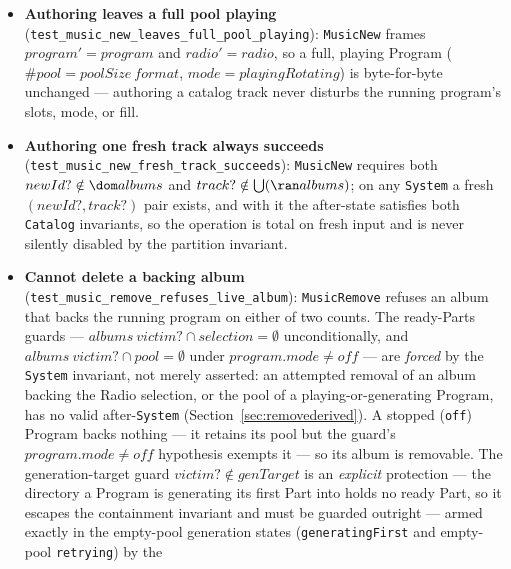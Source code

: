 \documentclass[a4paper,10pt,fleqn]{article}
\begin{document}
\begin{itemize}
    generate-internal outcome (\texttt{StaleFillIgnored}) and the auto
    vibe-switch (\texttt{RadioVibeIgnored}) stay \emph{enabled} against a Radio
    as total $\Xi Radio$ no-ops --- they are ignored, not disabled, and never
    errors. What is disabled is only the \emph{successful} fill branch: its
    $filling = ztrue$ guard has no inhabitant in a \texttt{Radio}, so that
    branch's precondition is false, leaving the enabled no-op as the sole
    inhabited operation.
  \item \textbf{Authoring leaves a full pool playing}
    (\texttt{test\_music\_new\_leaves\_full\_pool\_playing}): \texttt{MusicNew}
    frames $program' = program$ and $radio' = radio$, so a full, playing Program
    ($\# pool = poolSize~format$, $mode = playingRotating$) is byte-for-byte
    unchanged --- authoring a catalog track never disturbs the running
    program's slots, mode, or fill.
  \item \textbf{Authoring one fresh track always succeeds}
    (\texttt{test\_music\_new\_fresh\_track\_succeeds}): \texttt{MusicNew}
    requires both $newId? \notin \dom albums$ and
    $track? \notin \bigcup (\ran albums)$; on any \texttt{System} a fresh
    $(newId?, track?)$ pair exists, and with it the after-state satisfies both
    \texttt{Catalog} invariants, so the operation is total on fresh input and is
    never silently disabled by the partition invariant.
  \item \textbf{Cannot delete a backing album}
    (\texttt{test\_music\_remove\_refuses\_live\_album}): \texttt{MusicRemove}
    refuses an album that backs the running program on either of two counts. The
    ready-Parts guards --- $albums~victim? \cap selection = \emptyset$
    unconditionally, and $albums~victim? \cap pool = \emptyset$ under
    $program.mode \neq off$ --- are \emph{forced} by the \texttt{System}
    invariant, not merely asserted: an attempted removal of an album backing the
    Radio selection, or the pool of a playing-or-generating Program, has no valid
    after-\texttt{System} (Section~\ref{sec:removederived}). A stopped
    (\texttt{off}) Program backs nothing --- it retains its pool but the guard's
    $program.mode \neq off$ hypothesis exempts it --- so its album is removable.
    The generation-target guard $victim? \notin genTarget$ is an \emph{explicit}
    protection --- the directory a Program is generating its first Part into
    holds no ready Part, so it escapes the containment invariant and must be
    guarded outright --- armed exactly in the empty-pool generation states
    (\texttt{generatingFirst} and empty-pool \texttt{retrying}) by the

\end{itemize}
\end{document}
